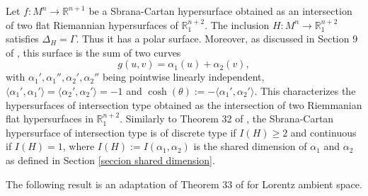 \documentclass{article}
\theoremstyle{remark}
\begin{document}
Let $f:M^n\rightarrow\mathbb{R}^{n+1}$ be a Sbrana-Cartan hypersurface obtained as an intersection of two flat Riemannian hypersurfaces of $\mathbb{R}^{n+2}_1$. The inclusion $H:M^n\rightarrow\mathbb{R}^{n+2}_1$ satisfies $\Delta_H=\Gamma$. Thus it has a polar surface. 
Moreover, as discussed in Section 9 of \cite{FF}, this surface is the sum of two curves
$$g(u,v)=\alpha_1(u)+\alpha_2(v),$$
with $\alpha_1', \alpha_1'', \alpha_2', \alpha_2''$ being pointwise linearly independent, $\langle\alpha_1',\alpha_1'\rangle=\langle\alpha_2',\alpha_2'\rangle=-1$ and $\cosh(\theta):=-\langle\alpha_1',\alpha_2'\rangle$. 
This characterizes the hypersurfaces of intersection type obtained as the intersection of two Riemmanian flat hypersurfaces in $\mathbb{R}^{n+2}_1$. 
Similarly to Theorem 32 of \cite{FF}, the Sbrana-Cartan hypersurface of intersection type is of discrete type if $I(H)\geq 2$ and continuous if $I(H)=1$, where $I(H):=I(\alpha_1,\alpha_2)$ is the shared dimension of $\alpha_1$ and $\alpha_2$ as defined in Section \ref{seccion shared dimension}. 

The following result is an adaptation of Theorem 33 of \cite{FF} for Lorentz ambient space.
\end{document}
